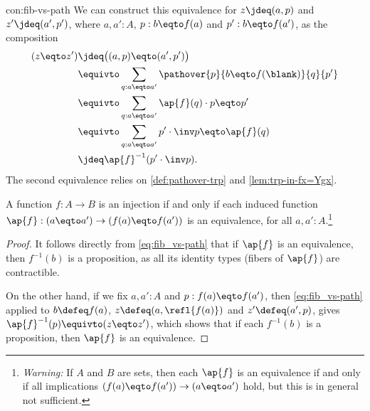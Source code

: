 \begin{implementation}{con:fib-vs-path}
  We can construct this equivalence for $z\jdeq(a,p)$ and $z'\jdeq(a',p')$,
  where $a,a':A$, $p:b \eqto f(a)$ and $p':b \eqto f(a')$,
  as the composition
  \begin{align*}
    (z \eqto z')
    &\jdeq \bigl( (a,p) \eqto (a',p') \bigr) \\
    &\equivto \sum_{q : a \eqto a'} \pathover{p}{b \eqto f(\blank)}{q}{p'} \\
    &\equivto \sum_{q : a \eqto a'} \ap{f}(q) \cdot p \eqto p' \\
    &\equivto \sum_{q : a \eqto a'} p' \cdot \inv p \eqto \ap{f}(q) \\
    &\jdeq \ap{f}^{-1}(p' \cdot \inv p).
  \end{align*}
  The second equivalence relies on \cref{def:pathover-trp}
  and \cref{lem:trp-in-fx=Ygx}.
\end{implementation}

\begin{lemma}\label{lem:inj-ap}
  A function $f:A\to B$ is an injection if and only if
  each induced function
  $\ap{f}: (a \eqto a') \to (f(a) \eqto f(a'))$ is an equivalence,
  for all $a,a':A$.\footnote{%
    \emph{Warning:}
    If $A$ and $B$ are sets, then each $\ap{f}$ is an equivalence
    if and only if all implications $(f(a) \eqto f(a')) \to (a \eqto a')$
    hold, but this is in general not sufficient.}
\end{lemma}

\begin{proof}
  It follows directly from \eqref{eq:fib_vs-path}
  that if $\ap{f}$ is an equivalence,
  then $f^{-1}(b)$ is a proposition,
  as all its identity types (fibers of $\ap{f}$) are contractible.

  On the other hand, if we fix $a,a':A$ and $p:f(a) \eqto f(a')$,
  then \eqref{eq:fib_vs-path} applied to $b \defeq f(a)$,
  $z \defeq (a,\refl{f(a)})$ and
  $z' \defeq (a',p)$,
  gives $\ap{f}^{-1}(p) \equivto (z \eqto z')$,
  which shows that if each $f^{-1}(b)$ is a proposition,
  then $\ap{f}$ is an equivalence.
\end{proof}


